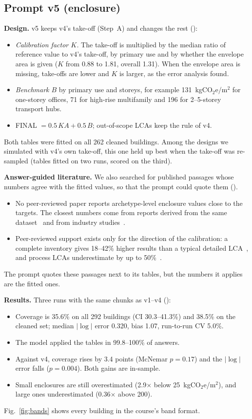 \documentclass[10pt,letterpaper]{article}
\newcommand{\coe}{kgCO$_2$e/m$^2$}
\begin{document}
\subsection{Prompt v5 (enclosure)}
\textbf{Design.} v5 keeps v4's take-off (Step~A) and changes the rest ():
\begin{itemize}
\item \emph{Calibration factor $K$.} The take-off is multiplied by the median ratio of reference value to v4's take-off, by primary use and by whether the envelope area is given ($K$ from 0.88 to 1.81, overall 1.31). When the envelope area is missing, take-offs are lower and $K$ is larger, as the error analysis found.
\item \emph{Benchmark $B$} by primary use and storeys, for example 131~\coe{} for one-storey offices, 71 for high-rise multifamily and 196 for 2--5-storey transport hubs.
\item FINAL $=0.5\,KA+0.5\,B$; out-of-scope LCAs keep the rule of v4.
\end{itemize}
Both tables were fitted on all 262 cleaned buildings. Among the designs we simulated with v4's own take-off, this one held up best when the take-off was re-sampled (tables fitted on two runs, scored on the third).

\textbf{Answer-guided literature.} We also searched for published passages whose numbers agree with the fitted values, so that the prompt could quote them ().
\begin{itemize}
\item No peer-reviewed paper reports archetype-level enclosure values close to the targets. The closest numbers come from reports derived from the same dataset~\cite{clfcalc,clfbench} and from industry studies~\cite{wbcsd,bdp}.
\item Peer-reviewed support exists only for the direction of the calibration: a complete inventory gives 18--42\% higher results than a typical detailed LCA~\cite{zimmermann}, and process LCAs underestimate by up to 50\%~\cite{heinonen}.
\end{itemize}
The prompt quotes these passages next to its tables, but the numbers it applies are the fitted ones.

\textbf{Results.} Three runs with the same chunks as v1--v4 ():
\begin{itemize}
\item Coverage is 35.6\% on all 292 buildings (CI 30.3--41.3\%) and 38.5\% on the cleaned set; median $|\log|$ error 0.320, bias 1.07, run-to-run CV 5.0\%.
\item The model applied the tables in 99.8--100\% of answers.
\item Against v4, coverage rises by 3.4 points (McNemar $p=0.17$) and the $|\log|$ error falls ($p=0.004$). Both gains are in-sample.
\item Small enclosures are still overestimated (2.9$\times$ below 25~\coe), and large ones underestimated (0.36$\times$ above 200).
\end{itemize}
Fig.~\ref{fig:bands} shows every building in the course's band format.
\end{document}
